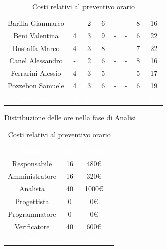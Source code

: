 \begin{table}[h!]
\begin{minipage}[c]{0.53\textwidth}
\begin{tabular}{>{\raggedright\arraybackslash}c|cccccc|c}
		\rowcolor[RGB]{216, 235, 171}
	    	Barilla Gianmarco & - & 2 & 6 & - & - & 8& 16		\\[4pt]
	    \rowcolor[RGB]{233, 245, 206}
	    	Beni Valentina & 4 & 3 & 9 & - & - & 6& 22			\\[4pt]
	    \rowcolor[RGB]{216, 235, 171}
	    	Bustaffa Marco & 4 & 3 & 8 & - & - & 7& 22			\\[4pt]
        \rowcolor[RGB]{233, 245, 206}
	    	Canel Alessandro & - & 2 & 6 & - & - & 8& 16			\\[4pt]
        \rowcolor[RGB]{216, 235, 171}
	    	Ferrarini Alessio & 4 & 3 & 5 & - & - & 5& 17		\\[4pt]
        \rowcolor[RGB]{233, 245, 206}
	    	Pozzebon Samuele & 4 & 3 & 6 & - & - & 6& 19			\\[4pt]
		\rowcolor[RGB]{47, 106, 73}
			\textcolor{white}{Totale Ruolo} & \textcolor{white}{16} & \textcolor{white}{16} & \textcolor{white}{40} 
			& \textcolor{white}{0} & \textcolor{white}{0} & \textcolor{white}{40}
			& \textcolor{white}{112} \\[4pt]	
    \end{tabular}
    \caption{Distribuzione delle ore nella fase di Analisi}
\end{minipage}
\hfill
\begin{minipage}{0.33\textwidth}
	\centering
	\begin{tabular}{cccc}
	    \rowcolor[RGB]{33, 73, 50}
	    \textcolor{white}{\textbf{Ruolo}} & \textcolor{white}{\textbf{Ore}} & \textcolor{white}{\textbf{Costo}}\\[4pt]
	    \rowcolor[RGB]{216, 235, 171}
	    Responsabile & 16 & 480\euro\\[4pt]
	    \rowcolor[RGB]{233, 245, 206}
	    Amministratore & 16 & 320\euro\\[4pt]
        \rowcolor[RGB]{216, 235, 171}
	    Analista & 40 & 1000\euro\\[4pt]
	    \rowcolor[RGB]{233, 245, 206}
	    Progettista & 0 & 0\euro\\[4pt]
        \rowcolor[RGB]{216, 235, 171}
	    Programmatore & 0 & 0\euro\\[4pt]
	    \rowcolor[RGB]{233, 245, 206}
	    Verificatore & 40 & 600\euro\\[4pt]
		\rowcolor[RGB]{47, 106, 73}
			\textcolor{white}{Totale} & \textcolor{white}{112} & \textcolor{white}{2400\euro}\\[4pt]	
    \end{tabular}	
	\caption{Costi relativi al preventivo orario}

\end{minipage}
\end{table}

